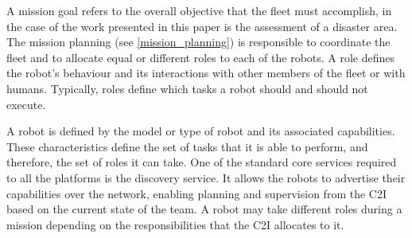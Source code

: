 \documentclass{article}
\begin{document}
A mission goal refers to the overall objective that the fleet must accomplish, in the case of the work presented in this paper is the assessment of a disaster area. The mission planning (see \ref{mission_planning}) is responsible to coordinate the fleet and to allocate equal or different roles to each of the robots. A role defines the robot's behaviour and its interactions with other members of the fleet or with humans. Typically, roles define which tasks a robot should and should not execute.

A robot is defined by the model or type of robot and its associated capabilities. These characteristics define the set of tasks that it is able to perform, and therefore, the set of roles it can take. One of the standard core services required to all the platforms is the discovery service. It allows the robots to advertise their capabilities over the network, enabling planning and supervision from the C2I based on the current state of the team. A robot may take different roles during a mission depending on the responsibilities that the C2I allocates to it.
\end{document}
